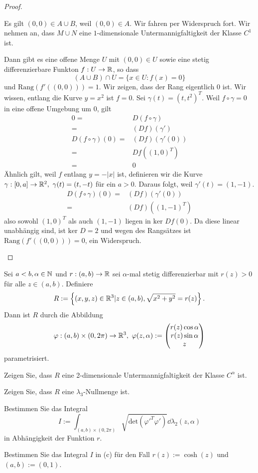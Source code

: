 \begin{proof}
\begin{parts}
	Es gilt $(0,0)\in A\cup B$, weil $(0,0)\in A$. Wir fahren per Widerspruch fort. Wir nehmen an, dass $M\cup N$ eine $1$-dimensionale Untermannigfaltigkeit der Klasse $C^1$ ist. 

	Dann gibt es eine offene Menge $U$ mit $(0,0)\in U$ sowie eine stetig differenzierbare Funkton $f:U\to \mathbb{R}$, so dass
	 \[
		 (A\cup B)\cap U=\{x\in U: f(x)=0\} 
	\] 
	und $\text{Rang}(f'((0,0)))=1$. Wir zeigen, dass der Rang eigentlich $0$ ist. Wir wissen, entlang die Kurve $y=x^2$ ist $f=0$. Sei $\gamma(t)= (t,t^2)^T$. Weil $f\circ \gamma=0$ in eine offene Umgebung um $0$, gilt
	\begin{align*}
		0=&D(f\circ \gamma)\\
		=&(Df)(\gamma')\\
		D(f\circ \gamma)(0)=&(Df)(\gamma'(0))\\
		=&Df((1,0)^T)\\
		=&0
	\end{align*}
	Ähnlich gilt, weil $f$ entlang $y=-|x|$ ist, definieren wir die Kurve $\gamma:[0,a]\to \mathbb{R}^2,~\gamma(t)=(t,-t)$ f\"{u}r ein $a>0$. Daraus folgt, weil $\gamma'(t)=(1,-1)$.
	\begin{align*}
		D(f\circ\gamma)(0)=&(Df)(\gamma'(0))\\
		=&(Df)((1,-1)^T)
	\end{align*}
	also sowohl $(1,0)^T$ als auch $(1,-1)$ liegen in $\text{ker }Df(0)$. Da diese linear unabhängig sind, ist $\text{ker }D=2$ und wegen des Rangsätzes ist $\text{Rang}(f'((0,0)))=0$, ein Widerspruch.\contradiction\qedhere
	\end{parts}
\end{proof}
\begin{Problem}
	Sei $a<b,\alpha\in \mathbb{N}$ und $r:(a,b)\to \mathbb{R}$ sei $\alpha$-mal stetig differenzierbar mit $r(z)>0$ f\"{u}r alle $z\in (a,b)$. Definiere
	\[
	R:=\left\{ (x,y,z)\in \mathbb{R}^3|z\in (a,b), \sqrt{x^2+y^2} =r(z) \right\} 
	.\] 
	Dann ist $R$ durch die Abbildung
	\[
	\varphi:(a,b)\times (0,2\pi)\to \mathbb{R}^3,~\varphi(z,\alpha):=\begin{pmatrix} r(z)\cos\alpha \\ r(z)\sin\alpha \\ z \end{pmatrix} 
\]
parametrisiert.
\begin{parts}
\item Zeigen Sie, dass $R$ eine 2-dimensionale Untermannigfaltigkeit der Klasse $C^\alpha$ ist.
\item Zeigen Sie, dass $R$ eine $\lambda_3$-Nullmenge ist.
\item Bestimmen Sie das Integral
	\[
		I:=\int_{(a,b)\times (0,2\pi)} \sqrt{\text{det}(\varphi'^T\varphi')} \dd{\lambda_2(z,\alpha)}
	\]
	in Abhängigkeit der Funktion $r$.
\item Bestimmen Sie das Integral $I$ in (c) f\"{u}r den Fall $r(z):=\cosh(z)$ und $(a,b):=(0,1)$.
\end{parts}
\end{Problem}
